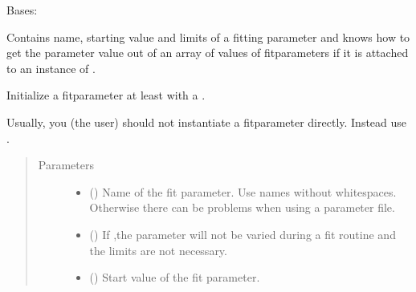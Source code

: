 \documentclass[letterpaper,10pt,english]{sphinxmanual}
\begin{document}
\begin{fulllineitems}
\label{\detokenize{modules-api/parameters:Parameters.Fitparameter}}
Bases: {\hyperref[\detokenize{modules-api/parameters:Parameters.Parameter}]{}}

Contains name, starting value and limits of a fitting parameter and knows how to get the parameter value out of an array of values of fitparameters if it is attached to an instance of {\hyperref[\detokenize{modules-api/parameters:Parameters.ParameterPool}]{}}.

\begin{fulllineitems}
\label{\detokenize{modules-api/parameters:Parameters.Fitparameter.__init__}}
Initialize a fitparameter at least with a .

Usually, you (the user) should not instantiate a fitparameter directly. Instead use {\hyperref[\detokenize{modules-api/parameters:Parameters.ParameterPool.newParameter}]{}}.
\begin{quote}\begin{description}
\item[{Parameters}] \leavevmode\begin{itemize}
\item {} 
 () \textendash{} Name of the fit parameter. Use names without whitespaces. Otherwise there can be problems when using a parameter file.

\item {} 
 () \textendash{} If ,the parameter will not be varied during a fit routine and the limits are not necessary.

\item {} 
 () \textendash{} Start value of the fit parameter.


\end{itemize}
\end{description}
\end{quote}
\end{fulllineitems}
\end{fulllineitems}
\end{document}
